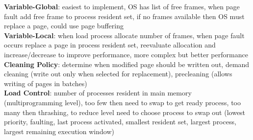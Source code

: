 \documentclass[a4paper]{article}
\begin{document}
\begin{multicols}{2}
        \textbf{Variable-Global}: easiest to implement, OS has list of free frames, when page fault add free frame to process resident set, if no frames available then OS must replace a page, could use page buffering\\
        \textbf{Variable-Local}: when load process allocate number of frames, when page fault occurs replace a page in process resident set, reevaluate allocation and increase/decrease to improve performance, more complex but better performance\\
        \textbf{Cleaning Policy}: determine when modified page should be written out, demand cleaning (write out only when selected for replacement), precleaning (allows writing of pages in batches)\\
        \textbf{Load Control}: number of processes resident in main memory (multiprogramming level), too few then need to swap to get ready process, too many then thrashing, to reduce level need to choose process to swap out (lowest priority, faulting, last process activated, smallest resident set, largest process, largest remaining execution window)\\
    \end{multicols}
    
\end{document}
